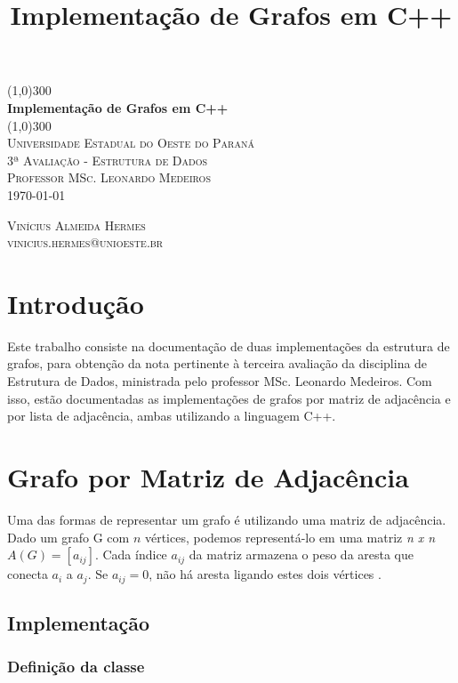 \documentclass{article}
\title{Implementação de Grafos em C++}
\begin{document}
\begin{titlepage}
	\begin{center}
    \line(1,0){300}\\
    [0.65cm]
    \huge{\bfseries Implementação de Grafos em C++}\\
	\line(1,0){300}\\
    \textsc{\LARGE Universidade Estadual do Oeste do Paraná}\\
	\textsc{\Large 3ª Avaliação - Estrutura de Dados}\\
    \textsc{\Large Professor MSc. Leonardo Medeiros}\\
	\textsc{\LARGE \today}\\
    [5.5cm]     
	\end{center}
	\begin{flushright}
		\textsc{\Large Vinícius Almeida Hermes\\vinicius.hermes@unioeste.br}\\
	\end{flushright}
\end{titlepage}

\section*{Introdução}

    Este trabalho consiste na documentação de duas implementações da estrutura de grafos, para obtenção da nota pertinente à terceira avaliação da disciplina de Estrutura de Dados, ministrada pelo professor MSc. Leonardo Medeiros. Com isso, estão documentadas as implementações de grafos por matriz de adjacência e por lista de adjacência, ambas utilizando a linguagem C++.

\section*{Grafo por Matriz de Adjacência}
    Uma das formas de representar um grafo é utilizando uma matriz de adjacência. Dado um grafo G com $n$ vértices, podemos representá-lo em uma matriz \textit{n x n} $A(G)=[a_{ij}]$. Cada índice $a_{ij}$ da matriz armazena o peso da aresta que conecta $a_i$ a $a_j$. Se $a_{ij} = 0$, não há aresta ligando estes dois vértices \cite{wikipedia:matriz_adjacencia}.

\subsection*{Implementação}
\subsubsection*{Definição da classe}
\end{document}
